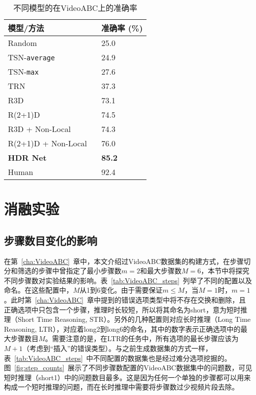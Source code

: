 \begin{table}[htbp]
\caption{不同模型的在VideoABC上的准确率}   
\label{tab:results}
\begin{tabu}to\textwidth{XX}\\
\toprule
   模型/方法 & 准确率 (\%) \\
    \midrule
    Random & 25.0 \\
    \midrule
    TSN-\texttt{average}~\cite{wang2016temporal} & 24.9\\
    TSN-\texttt{max}~\cite{wang2016temporal} & 27.6\\
	TRN~\cite{zhou2018temporal} & 37.3\\
	\midrule
	R3D~\cite{R3D} & 73.1\\
	R(2+1)D~\cite{R3D} & 74.5\\
	R3D + Non-Local~\cite{wang2017non} & 74.3\\
	R(2+1)D + Non-Local ~\cite{wang2017non} & 76.0\\
	\midrule
	\textbf{HDR Net} & \textbf{85.2}\\
	\midrule
	Human & 92.4\\\bottomrule
    \end{tabu}
\end{table}

\section{消融实验}\label{sec:exp:ablation}
\subsection{步骤数目变化的影响}
在第~\ref{cha:VideoABC}~章中，本文介绍过VideoABC数据集的构建方式，在步骤切分和筛选的步骤中曾指定了最小步骤数$m=2$和最大步骤数$M=6$，本节中将探究不同步骤数对实验结果的影响。表~\ref{tab:VideoABC_steps}~列举了不同的配置以及命名。在这些配置中，$M$从1到6变化。由于需要保证$m\le M$，当$M=1$时，$m=1$。此时第~\ref{cha:VideoABC}~章中提到的错误选项类型中将不存在交换和删除，且正确选项中只包含一个步骤，推理时长较短，所以将其命名为short，意为短时推理（Short Time Reasoning, STR）。另外的几种配置则对应长时推理（Long Time Reasoning, LTR），对应着long2到long6的命名，其中的数字表示正确选项中的最大步骤数目$M$。需要注意的是，在LTR的任务中，所有选项的最长步骤应该为$M+1$（考虑到“插入”的错误类型）。与之前生成数据集的方式一样，表~\ref{tab:VideoABC_steps}~中不同配置的数据集也是经过难分选项挖掘的。图~\ref{fig:step_counts}~展示了不同步骤数配置的VideoABC数据集中的问题数，可见短时推理（short1）中的问题数目最多。这是因为任何一个单独的步骤都可以用来构成一个短时推理的问题，而在长时推理中需要将步骤数过少视频片段去除。

